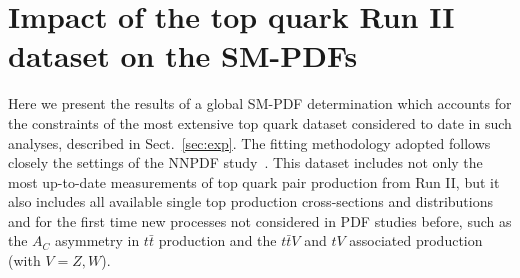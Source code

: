 \documentclass[withindex,glossary]{cam-thesis}
\begin{document}
%




\section{Impact of the top quark Run II dataset on the SM-PDFs}
\label{sec:baseline_sm_fits}

Here we present the results of a global SM-PDF determination which accounts for the constraints
of the most extensive top quark dataset considered to date
in such analyses, described in Sect.~\ref{sec:exp}.
%
The fitting methodology adopted follows closely the settings of the NNPDF
study~\cite{NNPDF:2021njg}.
%
This dataset includes not only the most up-to-date measurements of top quark
pair production from Run II, but it also includes all available single top
production cross-sections and distributions 
and for the first time new processes not considered in PDF studies before,
such as the $A_C$ asymmetry in $t\bar{t}$ production and the $t\bar{t}V$ and
$tV$ associated production (with $V = Z,W$).
\end{document}
